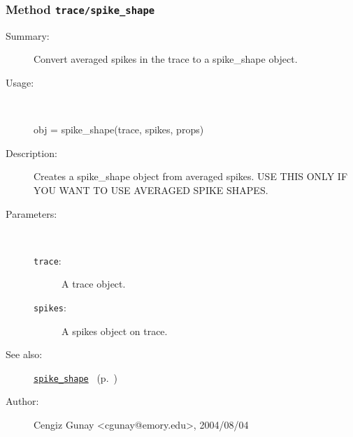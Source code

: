 \subsubsection[Method \texttt{spike\_shape}]{Method \texttt{trace/spike\_shape}}%
%
\label{ref_trace__spike_shape}%
\hypertarget{ref_trace__spike_shape}{}%
\begin{description}
\item[Summary:]Convert averaged spikes in the trace to a spike\_shape object.
%
\item[Usage:]~%
\begin{lyxcode}%
obj = spike\_shape(trace, spikes, props)
%
\end{lyxcode}%
%
\item[Description:]%
Creates a spike\_shape object from averaged spikes. USE THIS ONLY IF
 YOU WANT TO USE AVERAGED SPIKE SHAPES.
\item[Parameters:]~
\begin{description}%
\item[\texttt{trace}:]
 A trace object.
\item[\texttt{spikes}:]
 A spikes object on trace.
\end{description}%
%
%
%
\item[See also:]%
\hyperlink{ref_spike_shape}{\texttt{spike\_shape}}%
\ (p.~\pageref{ref_spike_shape})%
%
%
\item[Author:]%
Cengiz Gunay <cgunay@emory.edu>, 2004/08/04
%
\end{description}
\methodline%
